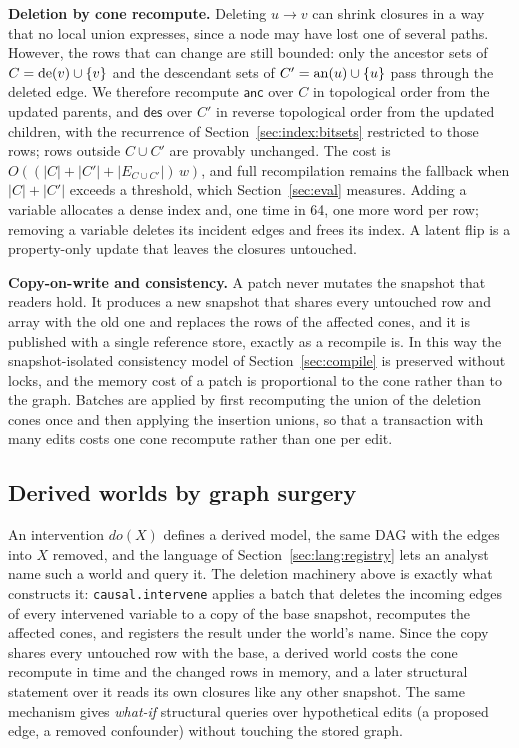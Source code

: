 \noindent\textbf{Deletion by cone recompute.} Deleting $u \rightarrow v$ can
shrink closures in a way that no local union expresses, since a node may
have lost one of several paths. However, the rows that can change are still
bounded: only the ancestor sets of $C = \mathrm{de}(v) \cup \{v\}$ and the descendant
sets of $C' = \mathrm{an}(u) \cup \{u\}$ pass through the deleted edge. We therefore
recompute $\textsf{anc}$ over $C$ in topological order from the updated
parents, and $\textsf{des}$ over $C'$ in reverse topological order from the
updated children, with the recurrence of Section~\ref{sec:index:bitsets}
restricted to those rows; rows outside $C \cup C'$ are provably unchanged.
The cost is $O((|C| + |C'| + |E_{C \cup C'}|)\,w)$, and full recompilation
remains the fallback when $|C| + |C'|$ exceeds a threshold, which
Section~\ref{sec:eval} measures. Adding a variable allocates a dense index
and, one time in 64, one more word per row; removing a variable deletes its
incident edges and frees its index. A \textsf{latent} flip is a property-only
update that leaves the closures untouched.

\noindent\textbf{Copy-on-write and consistency.} A patch never mutates the
snapshot that readers hold. It produces a new snapshot that shares every
untouched row and array with the old one and replaces the rows of the
affected cones, and it is published with a single reference store, exactly
as a recompile is. In this way the snapshot-isolated consistency model of
Section~\ref{sec:compile} is preserved without locks, and the memory cost of a
patch is proportional to the cone rather than to the graph. Batches are
applied by first recomputing the union of the deletion cones once and then
applying the insertion unions, so that a transaction with many edits costs
one cone recompute rather than one per edit.

\subsection{Derived worlds by graph surgery}\label{sec:incr:worlds}

An intervention $do(X)$ defines a derived model, the same DAG with the edges
into $X$ removed, and the language of Section~\ref{sec:lang:registry} lets an
analyst name such a world and query it. The deletion machinery above is
exactly what constructs it: \texttt{causal.intervene} applies a batch that
deletes the incoming edges of every intervened variable to a copy of the base
snapshot, recomputes the affected cones, and registers the result under the
world's name. Since the copy shares every untouched row with the base, a
derived world costs the cone recompute in time and the changed rows in
memory, and a later structural statement over it reads its own closures like
any other snapshot. The same mechanism gives \textit{what-if} structural
queries over hypothetical edits (a proposed edge, a removed confounder)
without touching the stored graph.
